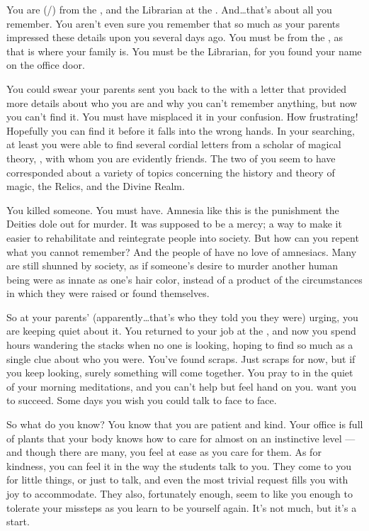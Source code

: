 \documentclass[char]{GL2020}
\begin{document}
\name{\cLibrarian{}}

You are \cLibrarian{\full} (\cLibrarian{\they}/\cLibrarian{\them}) from the \pTech{}, and the Librarian at the \pSchool{}. And\ldots that's about all you remember. You aren't even sure you remember that so much as your parents impressed these details upon you several days ago. You must be from the \pTech{}, as that is where your family is. You must be the Librarian, for you found your name on the office door. 

You could swear your parents sent you back to the \pSchool{} with a letter that provided more details about who you are and why you can’t remember anything, but now you can’t find it. You must have misplaced it in your confusion. How frustrating! Hopefully you can find it before it falls into the wrong hands. In your searching, at least you were able to find several cordial letters from a scholar of magical theory, \cWildCard{\full}, with whom you are evidently friends. The two of you seem to have corresponded about a variety of topics concerning the history and theory of magic, the Relics, and the Divine Realm.

You killed someone. You must have. Amnesia like this is the punishment the Deities dole out for murder. It was supposed to be a mercy; a way to make it easier to rehabilitate and reintegrate people into society. But how can you repent what you cannot remember? And the people of \pEarth{} have no love of amnesiacs. Many are still shunned by society, as if someone's desire to murder another human being were as innate as one's hair color, instead of a product of the circumstances in which they were raised or found themselves.

So at your parents’ (apparently\ldots that’s who they told you they were) urging, you are keeping quiet about it. You returned to your job at the \pSchool{}, and now you spend hours wandering the stacks when no one is looking, hoping to find so much as a single clue about who you were. You've found scraps. Just scraps for now, but if you keep looking, surely something will come together. You pray to \cTechGod{} in the quiet of your morning meditations, and you can't help but feel \cTechGod{\their} hand on you. \cTechGod{\They} want you to succeed. Some days you wish you could talk to \cTechGod{\them} face to face.

So what do you know? You know that you are patient and kind. Your office is full of plants that your body knows how to care for almost on an instinctive level — and though there are many, you feel at ease as you care for them. As for kindness, you can feel it in the way the students talk to you. They come to you for little things, or just to talk, and even the most trivial request fills you with joy to accommodate. They also, fortunately enough, seem to like you enough to tolerate your missteps as you learn to be yourself again. It's not much, but it's a start.
\end{document}
